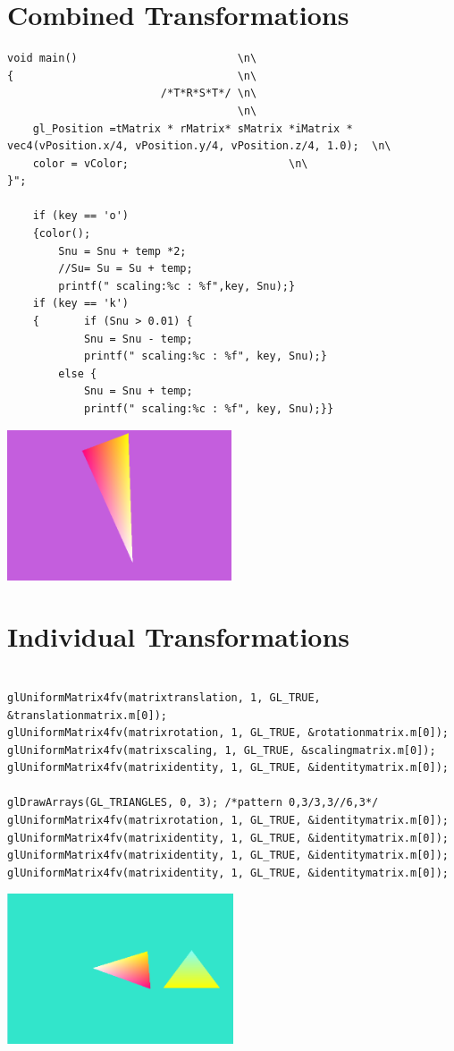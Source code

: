 \documentclass{article}
\begin{document}
\section{Combined Transformations}
\begin{lstlisting}
void main()                         \n\
{									\n\
						/*T*R*S*T*/	\n\
                                    \n\
    gl_Position =tMatrix * rMatrix* sMatrix *iMatrix * vec4(vPosition.x/4, vPosition.y/4, vPosition.z/4, 1.0);  \n\
	color = vColor;							\n\
}";

	if (key == 'o')
	{color();
		Snu = Snu + temp *2;
		//Su= Su = Su + temp;
		printf(" scaling:%c : %f",key, Snu);}
	if (key == 'k')
	{		if (Snu > 0.01) {
			Snu = Snu - temp;
			printf(" scaling:%c : %f", key, Snu);}
		else {
			Snu = Snu + temp;
			printf(" scaling:%c : %f", key, Snu);}}
\end{lstlisting}


\includegraphics[height=1.75in]{combinedtrans.PNG}


\section{Individual Transformations}
\begin{lstlisting}

glUniformMatrix4fv(matrixtranslation, 1, GL_TRUE, &translationmatrix.m[0]);
glUniformMatrix4fv(matrixrotation, 1, GL_TRUE, &rotationmatrix.m[0]);
glUniformMatrix4fv(matrixscaling, 1, GL_TRUE, &scalingmatrix.m[0]);
glUniformMatrix4fv(matrixidentity, 1, GL_TRUE, &identitymatrix.m[0]);

glDrawArrays(GL_TRIANGLES, 0, 3); /*pattern 0,3/3,3//6,3*/	glUniformMatrix4fv(matrixrotation, 1, GL_TRUE, &identitymatrix.m[0]);
glUniformMatrix4fv(matrixidentity, 1, GL_TRUE, &identitymatrix.m[0]);
glUniformMatrix4fv(matrixidentity, 1, GL_TRUE, &identitymatrix.m[0]);
glUniformMatrix4fv(matrixidentity, 1, GL_TRUE, &identitymatrix.m[0]);

\end{lstlisting}
\includegraphics[height=1.75in]{rotation.PNG}
\pagebreak

	
\end{document}

